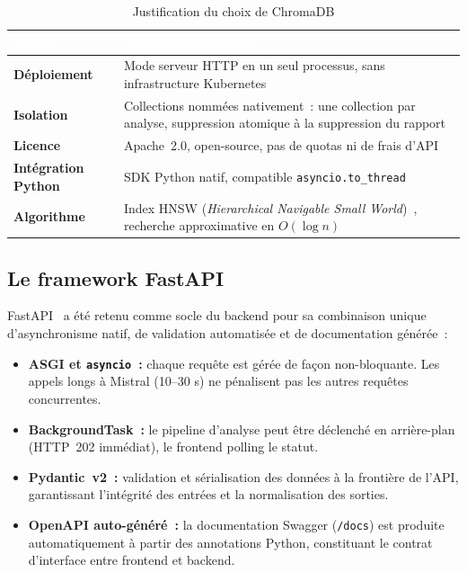 \documentclass[a4paper,12pt,oneside]{report}
\newcommand{\colhead}[1]{\textcolor{white}{\bfseries #1}}
\newcommand{\headrow}{\rowcolor{headerblue}}
\begin{document}
	\begin{table}[H]
		\centering
		\begin{tabularx}{\textwidth}{@{}>{\bfseries\color{titleblue}}l X@{}}
			\toprule
			\headrow \colhead{Crit\`ere} & \colhead{Avantage ChromaDB} \\
			\midrule
			D\'eploiement & Mode serveur HTTP en un seul processus, sans infrastructure Kubernetes \\
			\rowcolor{rowalt} Isolation & Collections nomm\'ees nativement~: une collection par analyse,
			suppression atomique \`a la suppression du rapport \\
			Licence & Apache~2.0, open-source, pas de quotas ni de frais d'API \\
			\rowcolor{rowalt} Int\'egration Python & SDK Python natif, compatible \texttt{asyncio.to\_thread} \\
			Algorithme & Index HNSW (\textit{Hierarchical Navigable Small World})~\cite{malkov2018hnsw},
			recherche approximative en $O(\log n)$ \\
			\bottomrule
		\end{tabularx}
		\caption{Justification du choix de ChromaDB}
		\label{tab:chromadb}
	\end{table}
	
	\subsection{Le framework FastAPI}
	
	FastAPI~\cite{fastapi} a \'et\'e retenu comme socle du backend pour sa combinaison unique
	d'asynchronisme natif, de validation automatis\'ee et de documentation g\'en\'er\'ee~:
	
	\begin{itemize}[leftmargin=1.5em,itemsep=4pt]
		\item \textbf{ASGI et \texttt{asyncio}~:} chaque requ\^ete est g\'er\'ee de
		fa\c{c}on non-bloquante. Les appels longs \`a Mistral (10--30 s) ne
		p\'enalisent pas les autres requ\^etes concurrentes.
		\item \textbf{BackgroundTask~:} le pipeline d'analyse peut \^etre d\'eclench\'e
		en arri\`ere-plan (HTTP~202 imm\'ediat), le frontend polling le statut.
		\item \textbf{Pydantic~v2~:} validation et s\'erialisation des donn\'ees
		\`a la fronti\`ere de l'API, garantissant l'int\'egrit\'e des entr\'ees
		et la normalisation des sorties.
		\item \textbf{OpenAPI auto-g\'en\'er\'e~:} la documentation Swagger
		(\texttt{/docs}) est produite automatiquement \`a partir des annotations
		Python, constituant le contrat d'interface entre frontend et backend.
	\end{itemize}
	
\end{document}
